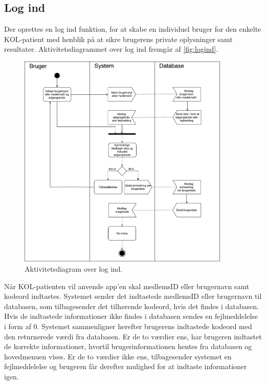 \subsection*{Log ind}
Der oprettes en log ind funktion, for at skabe en individuel bruger for den enkelte KOL-patient med henblik på at sikre brugerens private oplysninger samt resultater. Aktivitetsdiagrammet over log ind fremgår af \autoref{fig:logind}. 

\begin{figure} [H]
\centering
\includegraphics[width=0.9\textwidth]{figures/aktivitetsdiagram/Logind}
\caption{Aktivitetsdiagram over log ind.}
\label{fig:logind}
\end{figure}


\noindent
Når KOL-patienten vil anvende app'en skal medlemsID eller brugernavn samt kodeord indtastes. Systemet sender det indtastede medlemsID eller brugernavn til databasen, som tilbagesender det tilhørende kodeord, hvis det findes i databasen. Hvis de indtastede informationer ikke findes i databasen sendes en fejlmeddelelse i form af 0. Systemet sammenligner herefter brugerens indtastede kodeord med den returnerede værdi fra databasen. Er de to værdier ens, har brugeren indtastet de korrekte informationer, hvortil brugerinformationen hentes fra databasen og hovedmenuen vises. Er de to værdier ikke ens, tilbagesender systemet en fejlmeddelelse og brugeren får derefter mulighed for at indtaste informationer igen. 